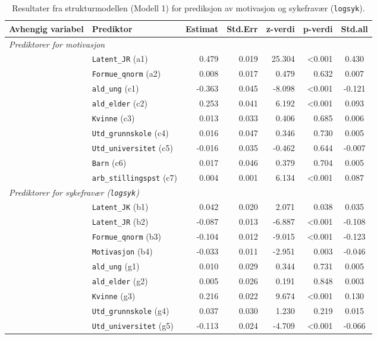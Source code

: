 \documentclass[
  12pt,
  a4paper,
  DIV=11,
  numbers=noendperiod]{scrartcl}
\begin{document}
\begin{table}[htbp]
\centering
\caption{Resultater fra strukturmodellen (Modell 1) for prediksjon av motivasjon og sykefravær (\texttt{logsyk}).}
\label{tab:sem_results_model1}
\begin{tabular}{@{}llrrrrc@{}}
\toprule
Avhengig variabel & Prediktor & Estimat & Std.Err & z-verdi & p-verdi & Std.all \\
\midrule
\multicolumn{7}{l}{\textit{Prediktorer for motivasjon}} \\
& \texttt{Latent\_JR} (a1) & 0.479 & 0.019 & 25.304 & <0.001 & 0.430 \\
& \texttt{Formue\_qnorm} (a2) & 0.008 & 0.017 & 0.479 & 0.632 & 0.007 \\
& \texttt{ald\_ung} (c1) & -0.363 & 0.045 & -8.098 & <0.001 & -0.121 \\
& \texttt{ald\_elder} (c2) & 0.253 & 0.041 & 6.192 & <0.001 & 0.093 \\
& \texttt{Kvinne} (c3) & 0.013 & 0.033 & 0.406 & 0.685 & 0.006 \\
& \texttt{Utd\_grunnskole} (c4) & 0.016 & 0.047 & 0.346 & 0.730 & 0.005 \\
& \texttt{Utd\_universitet} (c5) & -0.016 & 0.035 & -0.462 & 0.644 & -0.007 \\
& \texttt{Barn} (c6) & 0.017 & 0.046 & 0.379 & 0.704 & 0.005 \\
& \texttt{arb\_stillingspst} (c7) & 0.004 & 0.001 & 6.134 & <0.001 & 0.087 \\
\midrule
\multicolumn{7}{l}{\textit{Prediktorer for sykefravær (\texttt{logsyk})}} \\
& \texttt{Latent\_JK} (b1) & 0.042 & 0.020 & 2.071 & 0.038 & 0.035 \\
& \texttt{Latent\_JR} (b2) & -0.087 & 0.013 & -6.887 & <0.001 & -0.108 \\
& \texttt{Formue\_qnorm} (b3) & -0.104 & 0.012 & -9.015 & <0.001 & -0.123 \\
& \texttt{Motivasjon} (b4) & -0.033 & 0.011 & -2.951 & 0.003 & -0.046 \\
& \texttt{ald\_ung} (g1) & 0.010 & 0.029 & 0.344 & 0.731 & 0.005 \\
& \texttt{ald\_elder} (g2) & 0.005 & 0.026 & 0.191 & 0.848 & 0.003 \\
& \texttt{Kvinne} (g3) & 0.216 & 0.022 & 9.674 & <0.001 & 0.130 \\
& \texttt{Utd\_grunnskole} (g4) & 0.037 & 0.030 & 1.230 & 0.219 & 0.015 \\
& \texttt{Utd\_universitet} (g5) & -0.113 & 0.024 & -4.709 & <0.001 & -0.066 \\

\end{tabular}
\end{table}
\end{document}
